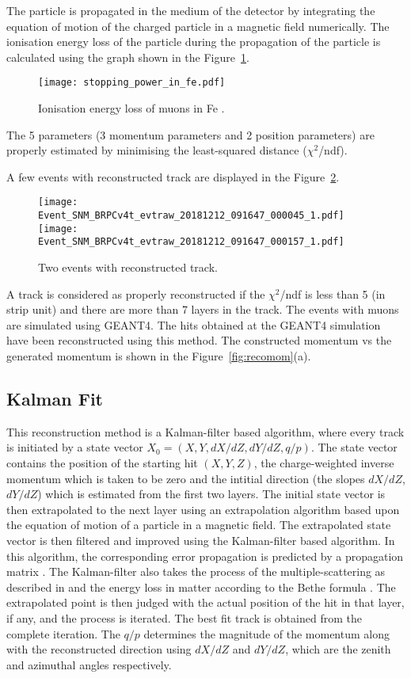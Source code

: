 The particle is propagated in the medium of the detector by integrating
the equation of motion of the charged particle in a magnetic field
numerically. The ionisation energy loss of the particle during the
propagation of the particle is calculated using the graph shown in the
Figure~\ref{fig:eloss}.
\begin{figure}[h]
  \centering
  \texttt{[image: stopping\_power\_in\_fe.pdf]}
  \caption{Ionisation energy loss of muons in Fe \cite{pdgspectra1,bethe1}.}
  \label{fig:eloss}
\end{figure}

The 5 parameters (3 momentum parameters and 2 position parameters) are
properly estimated by minimising the least-squared distance
($\chi^{2}$/ndf).

A few events with reconstructed track are displayed in the
Figure~\ref{fig:eventdisplay}.
\begin{figure}[h]
  \texttt{[image: Event\_SNM\_BRPCv4t\_evtraw\_20181212\_091647\_000045\_1.pdf]}
  \texttt{[image: Event\_SNM\_BRPCv4t\_evtraw\_20181212\_091647\_000157\_1.pdf]}
  \caption{Two events with reconstructed track.}
  \label{fig:eventdisplay}
\end{figure}
A track is considered as properly reconstructed if the $\chi^{2}$/ndf
is less than 5 (in strip unit) and there are more than 7 layers in
the track.
The events with muons are simulated using GEANT4. The hits obtained
at the GEANT4 simulation have been reconstructed using this method.
The constructed momentum vs the generated momentum is shown in the
Figure~\ref{fig:recomom}(a).

\subsection{Kalman Fit}
This reconstruction method is a Kalman-filter based algorithm, where
every track is initiated by a state vector
$X_{0}=\left(X,Y,dX/dZ,dY/dZ,q/p\right)$. The state vector contains
the position of the starting hit $\left(X,Y,Z\right)$,
the charge-weighted inverse momentum which is taken to be zero and
the intitial direction (the slopes $dX/dZ$, $dY/dZ$) which is
estimated from the first two layers. The initial state vector is then
extrapolated to the next layer using an extrapolation algorithm based
upon the equation of motion of a particle in a magnetic field. The
extrapolated state vector is then filtered and improved using the
Kalman-filter based algorithm. In this algorithm, the corresponding
error propagation is predicted by a propagation matrix \cite{kalman1}.
The Kalman-filter also takes the process of the multiple-scattering
as described in \cite{kalman2} and the energy loss in matter according
to the Bethe formula \cite{bethe1}. The extrapolated point is then
judged with the actual position of the hit in that layer, if any, and
the process is iterated. The best fit track is obtained from the
complete iteration. The $q/p$ determines the magnitude of the momentum
along with the reconstructed direction using $dX/dZ$ and $dY/dZ$, which
are the zenith and azimuthal angles respectively.

